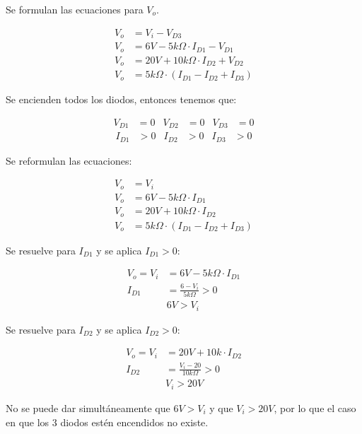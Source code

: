 \documentclass[12pt]{article}
\begin{document}
Se formulan las ecuaciones para $V_o$.

\begin{align*}
  V_o &= V_i - V_{D3} \\
  V_o &= 6V - 5k\Omega \cdot I_{D1} - V_{D1} \\
  V_o &= 20V + 10k\Omega \cdot I_{D2} + V_{D2} \\
  V_o &= 5k\Omega \cdot \left( I_{D1} - I_{D2} + I_{D3} \right)
\end{align*}

Se encienden todos los diodos, entonces tenemos que:

\begin{align*}
  V_{D1} &= 0 & V_{D2} &= 0 & V_{D3} &= 0
\end{align*}
\begin{align*}
  I_{D1} &> 0 & I_{D2} &> 0 & I_{D3} &> 0
\end{align*}

Se reformulan las ecuaciones:

\begin{align*}
  V_o &= V_i \\
  V_o &= 6V - 5k\Omega \cdot I_{D1} \\
  V_o &= 20V + 10k\Omega \cdot I_{D2} \\
  V_o &= 5k\Omega \cdot \left( I_{D1} - I_{D2} + I_{D3} \right)
\end{align*}

Se resuelve para $I_{D1}$ y se aplica $I_{D1} > 0$:

\begin{align*}
  V_o = V_i &= 6V - 5k\Omega \cdot I_{D1} \\
  I_{D1} &= \frac{6 - V_i}{5k\Omega} > 0 \\
  & 6V > V_i
\end{align*}

Se resuelve para $I_{D2}$ y se aplica $I_{D2} > 0$:

\begin{align*}
  V_o = V_i &= 20V + 10k \cdot I_{D2} \\
  I_{D2} &= \frac{V_i - 20}{10k\Omega} > 0 \\
  & V_i > 20V
\end{align*}

No se puede dar simultáneamente que $6V > V_i$ y que  $V_i > 20V$, por lo que el
caso en que los 3 diodos estén encendidos no existe.
\end{document}
